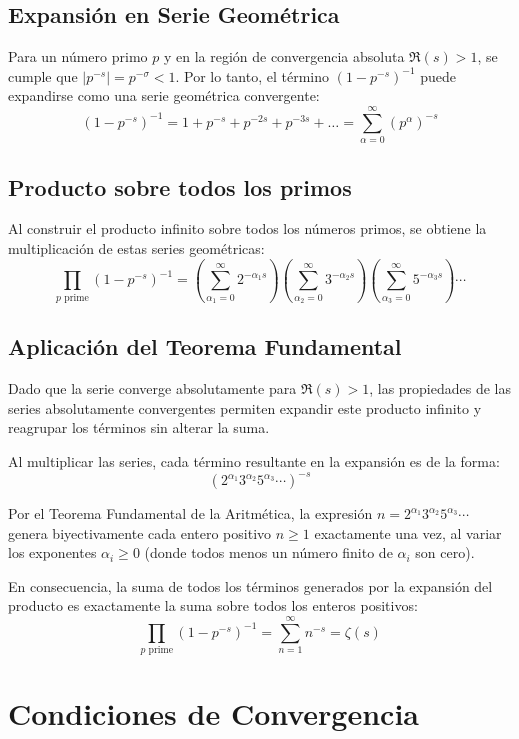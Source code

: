 \documentclass{article}
\begin{document}
\subsection{Expansión en Serie Geométrica}

Para un número primo $p$ y en la región de convergencia absoluta $\Re(s) > 1$, se cumple que $|p^{-s}| = p^{-\sigma} < 1$. Por lo tanto, el término $(1 - p^{-s})^{-1}$ puede expandirse como una serie geométrica convergente:
$$ (1 - p^{-s})^{-1} = 1 + p^{-s} + p^{-2s} + p^{-3s} + \dots = \sum_{\alpha=0}^{\infty} (p^{\alpha})^{-s} $$

\subsection{Producto sobre todos los primos}

Al construir el producto infinito sobre todos los números primos, se obtiene la multiplicación de estas series geométricas:
$$ \prod_{p \text{ prime}} \left(1 - p^{-s}\right)^{-1} = \left( \sum_{\alpha_1=0}^{\infty} 2^{-\alpha_1 s} \right) \left( \sum_{\alpha_2=0}^{\infty} 3^{-\alpha_2 s} \right) \left( \sum_{\alpha_3=0}^{\infty} 5^{-\alpha_3 s} \right) \cdots $$

\subsection{Aplicación del Teorema Fundamental}

Dado que la serie converge absolutamente para $\Re(s) > 1$, las propiedades de las series absolutamente convergentes permiten expandir este producto infinito y reagrupar los términos sin alterar la suma.

Al multiplicar las series, cada término resultante en la expansión es de la forma:
$$ (2^{\alpha_1} 3^{\alpha_2} 5^{\alpha_3} \cdots)^{-s} $$

Por el Teorema Fundamental de la Aritmética, la expresión $n = 2^{\alpha_1} 3^{\alpha_2} 5^{\alpha_3} \cdots$ genera biyectivamente cada entero positivo $n \geq 1$ exactamente una vez, al variar los exponentes $\alpha_i \geq 0$ (donde todos menos un número finito de $\alpha_i$ son cero).

En consecuencia, la suma de todos los términos generados por la expansión del producto es exactamente la suma sobre todos los enteros positivos:
$$ \prod_{p \text{ prime}} \left(1 - p^{-s}\right)^{-1} = \sum_{n=1}^{\infty} n^{-s} = \zeta(s) $$

\section{Condiciones de Convergencia}
\end{document}
